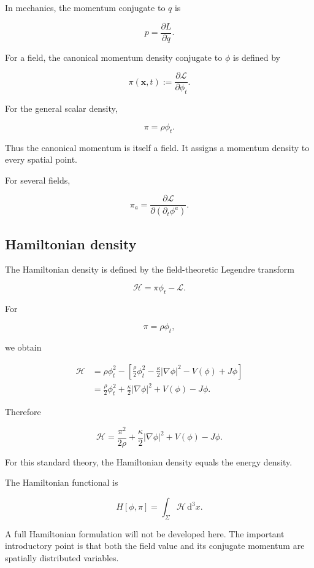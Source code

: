 In mechanics, the momentum conjugate to \(q\) is

\[
p=\frac{\partial L}{\partial\dot q}.
\]

For a field, the canonical momentum density conjugate to \(\phi\) is defined by

\[
\boxed{
\pi(\mathbf{x},t)
:=
\frac{\partial\mathcal{L}}
{\partial\phi_{t}}
}.
\]

For the general scalar density,

\[
\pi
=
\rho\phi_{t}.
\]

Thus the canonical momentum is itself a field. It assigns a momentum density to every spatial point.

For several fields,

\[
\pi_{a}
=
\frac{\partial\mathcal{L}}
{\partial(\partial_{t}\phi^{a})}.
\]

\subsection{Hamiltonian density}

The Hamiltonian density is defined by the field-theoretic Legendre transform

\[
\boxed{
\mathcal{H}
=
\pi\phi_{t}-\mathcal{L}
}.
\]

For

\[
\pi=\rho\phi_{t},
\]

we obtain

\[
\begin{aligned}
\mathcal{H}
&=
\rho\phi_{t}^{2}
-
\left[
\frac{\rho}{2}\phi_{t}^{2}
-
\frac{\kappa}{2}|\nabla\phi|^{2}
-
V(\phi)
+
J\phi
\right]\\
&=
\frac{\rho}{2}\phi_{t}^{2}
+
\frac{\kappa}{2}|\nabla\phi|^{2}
+
V(\phi)
-
J\phi.
\end{aligned}
\]

Therefore

\[
\boxed{
\mathcal{H}
=
\frac{\pi^{2}}{2\rho}
+
\frac{\kappa}{2}|\nabla\phi|^{2}
+
V(\phi)
-
J\phi
}.
\]

For this standard theory, the Hamiltonian density equals the energy density.

The Hamiltonian functional is

\[
\boxed{
H[\phi,\pi]
=
\int_{\Sigma}
\mathcal{H}
\,\mathrm{d}^{3}x
}.
\]

A full Hamiltonian formulation will not be developed here. The important introductory point is that both the field value and its conjugate momentum are spatially distributed variables.


